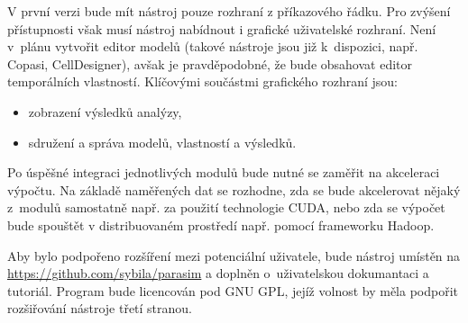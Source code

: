 \documentclass[a4paper]{article}
\begin{document}
\begin{enumerate}
        V první verzi bude mít nástroj pouze rozhraní z příkazového řádku. Pro zvýšení
        přístupnosti však musí nástroj nabídnout i grafické uživatelské rozhraní. Není
        v~plánu vytvořit editor modelů (takové nástroje jsou již k~dispozici, např. Copasi, CellDesigner),
        avšak je pravděpodobné, že bude obsahovat editor temporálních vlastností. 
        Klíčovými součástmi grafického rozhraní jsou:
        \begin{itemize}
            \item   zobrazení výsledků analýzy,
            \item   sdružení a správa modelů, vlastností a výsledků.
        \end{itemize}

        Po úspěšné integraci jednotlivých modulů bude nutné se zaměřit na akceleraci
        výpočtu. Na základě naměřených dat se rozhodne, zda se bude akcelerovat
        nějaký z~modulů samostatně např. za použití technologie CUDA,
        nebo zda se výpočet bude spouštět v distribuovaném prostředí např. pomocí frameworku
        Hadoop.

        Aby bylo podpořeno rozšíření mezi potenciální uživatele, bude nástroj
        umístěn na \url{https://github.com/sybila/parasim} a doplněn o~uživatelskou
        dokumantaci a tutoriál.
        Program bude licencován pod GNU GPL, jejíž volnost
        by měla podpořit rozšiřování nástroje třetí stranou.


\end{enumerate}
\end{document}
